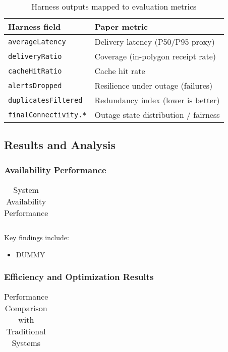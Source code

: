 \documentclass[11pt,twocolumn]{article}
\begin{document}
\begin{table}[ht]
\centering
\caption{Harness outputs mapped to evaluation metrics}
\begin{tabular}{@{}l l@{}}
\toprule
Harness field & Paper metric \\ \midrule
\texttt{averageLatency} & Delivery latency (P50/P95 proxy) \\
\texttt{deliveryRatio} & Coverage (in-polygon receipt rate) \\
\texttt{cacheHitRatio} & Cache hit rate \\
\texttt{alertsDropped} & Resilience under outage (failures) \\
\texttt{duplicatesFiltered} & Redundancy index (lower is better) \\
\texttt{finalConnectivity.*} & Outage state distribution / fairness \\
\bottomrule
\end{tabular}
\end{table}

\subsection{Results and Analysis}

\subsubsection{Availability Performance}

\begin{table}[ht]
\centering
\caption{System Availability Performance}
\begin{tabular}{@{}lccc@{}}
\end{tabular}
\end{table}

Key findings include:
\begin{itemize}
\item DUMMY
\end{itemize}

\subsubsection{Efficiency and Optimization Results}

\begin{table}[ht]
\centering
\caption{Performance Comparison with Traditional Systems}
\begin{tabular}{@{}lccc@{}}
\end{tabular}
\end{table}
\end{document}
